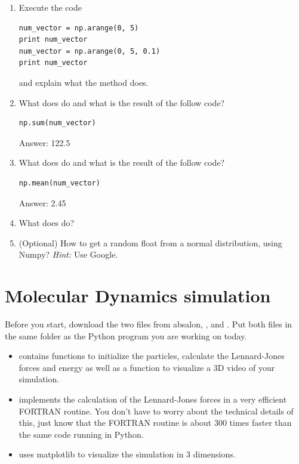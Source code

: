 \documentclass{article}
\begin{document}
\begin{enumerate}[resume]
   \item Execute the code

\begin{lstlisting}
num_vector = np.arange(0, 5)
print num_vector
num_vector = np.arange(0, 5, 0.1)
print num_vector
\end{lstlisting}

   and explain what the method  does.

   \item What does  do and what is the result of the follow code?

\begin{lstlisting}
np.sum(num_vector)
\end{lstlisting}

   Answer: 122.5

   \item What does  do and what is the result of the follow code?

\begin{lstlisting}
np.mean(num_vector)
\end{lstlisting}

   Answer: 2.45

   \item What does  do?

   \item (Optional) How to get a random float from a normal distribution, using Numpy? \newline
       {\em Hint:} Use Google.

\end{enumerate}


\newpage

\section{Molecular Dynamics simulation}

Before you start, download the two files from absalon, ,  and .
Put both files in the same folder as the Python program you are working on today.

\begin{itemize}

    \item {} contains functions to initialize the particles, calculate the Lennard-Jones forces and energy as well as a function to visualize a 3D video of your simulation.
    \item {} implements the calculation of the Lennard-Jones forces in a very efficient FORTRAN routine.
        You don't have to worry about the technical details of this, just know that the FORTRAN routine is about 300 times faster than the same code running in Python.

    \item {} uses matplotlib to visualize the simulation in 3 dimensions.

\end{itemize}
\end{document}
